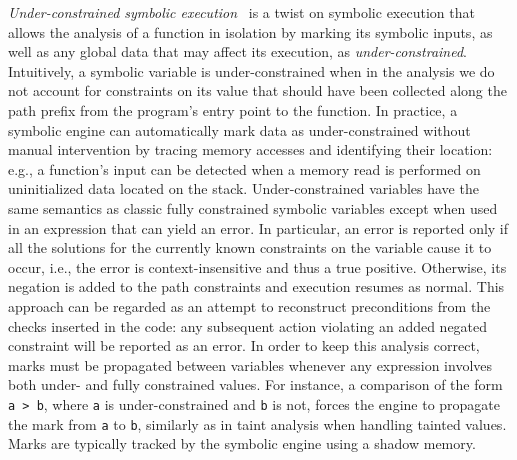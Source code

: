 {\em Under-constrained symbolic execution}~\cite{ED-ISSTA07} is a twist on symbolic execution that allows the analysis of a function in isolation by marking its symbolic inputs, as well as any global data that may affect its execution, as {\em under-constrained}. Intuitively, a symbolic variable is under-constrained when in the analysis we do not account for constraints on its value that should have been collected along the path prefix from the program's entry point to the function. In practice, a symbolic engine can automatically mark data as under-constrained without manual intervention by tracing memory accesses and identifying their location: e.g., a function's input can be detected when a memory read is performed on uninitialized data located on the stack. Under-constrained variables have the same semantics as classic fully constrained symbolic variables except when used in an expression that can yield an error. In particular, an error is reported only if all the solutions for the currently known constraints on the variable cause it to occur, i.e., the error is context-insensitive and thus a true positive. Otherwise, its negation is added to the path constraints and execution resumes as normal. This approach can be regarded as an attempt to reconstruct preconditions from the checks inserted in the code: any subsequent action violating an added negated constraint will be reported as an error. In order to keep this analysis correct, marks must be propagated between variables whenever any expression involves both under- and fully constrained values. For instance, a comparison of the form {\tt a > b}, where {\tt a} is under-constrained and {\tt b} is not, forces the engine to propagate the mark from {\tt a} to {\tt b}, similarly as in taint analysis when handling tainted values. Marks are typically tracked by the symbolic engine using a shadow memory.



